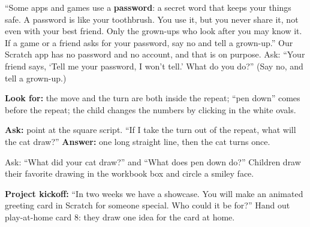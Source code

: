 \begin{safety}
\enquote{Some apps and games use a \textbf{password}: a secret word that keeps your things safe. A password is like your toothbrush. You use it, but you never share it, not even with your best friend. Only the grown-ups who look after you may know it. If a game or a friend asks for your password, say no and tell a grown-up.} Our Scratch app has no password and no account, and that is on purpose. Ask: \enquote{Your friend says, \enquote{Tell me your password, I won't tell.} What do you do?} (Say no, and tell a grown-up.)
\end{safety}

\begin{formativecheck}
\textbf{Look for:} the move and the turn are both inside the repeat; \enquote{pen down} comes before the repeat; the child changes the numbers by clicking in the white ovals.

\textbf{Ask:} point at the square script. \enquote{If I take the turn out of the repeat, what will the cat draw?}
\textbf{Answer:} one long straight line, then the cat turns once.
\end{formativecheck}

\begin{reflection}
Ask: \enquote{What did your cat draw?} and \enquote{What does pen down do?} Children draw their favorite drawing in the workbook box and circle a smiley face.

\textbf{Project kickoff:} \enquote{In two weeks we have a showcase. You will make an animated greeting card in Scratch for someone special. Who could it be for?} Hand out play-at-home card 8: they draw one idea for the card at home.
\end{reflection}

